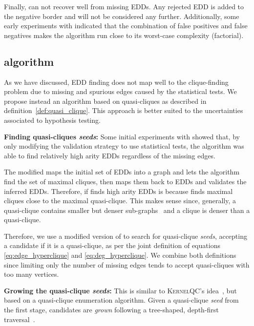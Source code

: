 Finally, \Zigzag can not recover well from missing
\glspl{EDD}. Any rejected \gls{EDD} is added to the negative border
and will not be considered any further. Additionally, some
early experiments with \Zigzag indicated
that the combination of false positives and false negatives
makes the algorithm run close to its worst-case complexity (factorial).

\subsection{\PresQ algorithm}
\label{sec:presq}

As we have discussed, \gls{EDD} finding does not map well to the clique-finding
problem due to missing and spurious edges caused by the statistical tests. We propose instead
an algorithm based on quasi-cliques as described in definition~\ref{def:quasi_clique}.
This approach is better suited to the uncertainties associated to hypothesis testing.

\textbf{Finding quasi-cliques \emph{seeds}:} Some initial experiments with \Find showed that,
by only modifying the validation strategy to use statistical tests, the algorithm was able
to find relatively high arity \glspl{EDD} regardless of the missing edges.

The modified \Find maps the initial set of \glspl{EDD} into a graph and lets the \Hyperclique
algorithm find the set of maximal cliques, then maps them back to \glspl{EDD} and validates the
inferred \glspl{EDD}. Therefore, if \Find finds high arity \glspl{EDD} is because \Hyperclique finds
maximal cliques close to the maximal quasi-clique. This makes sense since, generally,
a quasi-clique contains smaller but denser sub-graphs~\cite{SaneiMehri2018} and a clique
is denser than a quasi-clique.

Therefore, we use a modified version of \Hyperclique to search for quasi-clique \emph{seeds},
accepting a candidate if it is a quasi-clique, as per the joint definition of equations
\ref{eq:edge_hyperclique} and \ref{eq:deg_hyperclique}.
We combine both definitions since limiting only the number of missing edges tends to accept
quasi-cliques with too many vertices.

\textbf{Growing the quasi-clique \emph{seeds}:} This is similar
to \textsc{KernelQC}'s idea~\cite{SaneiMehri2018}, but based on
a quasi-clique enumeration algorithm. Given a quasi-clique
\emph{seed} from the first stage, candidates are \emph{grown} following a tree-shaped,
depth-first traversal~\cite{uno_efficient_2010}.

